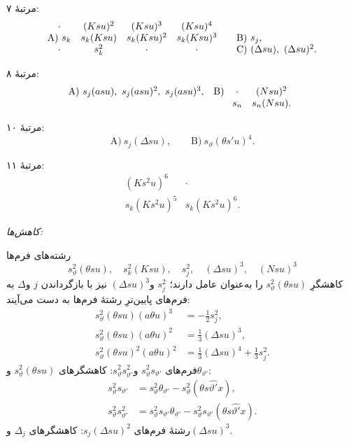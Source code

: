 \documentclass[11pt]{article}
\begin{document}
\noindent مرتبهٔ ۷:
\[
\begin{array}{c@{\quad}c@{\quad}c@{\quad}c@{\qquad}l}
\cdot&(Ksu)^2&(Ksu)^3&(Ksu)^4&\\
\text{A)}\ s_k&s_k(Ksu)&s_k(Ksu)^2&s_k(Ksu)^3&
\text{B)}\ s_j,\\
\cdot&s_k^2&\cdot&\cdot&
\text{C)}\ (\Delta su),\ (\Delta su)^2.
\end{array}
\]

\noindent مرتبهٔ ۸:
\[
\begin{array}{ll}
\text{A)}\ s_j(asu),\ s_j(asu)^2,\ s_j(asu)^3,
&
\text{B)}\ \begin{array}[t]{cc}
\cdot&(Nsu)^2\\
s_n&s_n(Nsu).
\end{array}
\end{array}
\]

\noindent مرتبهٔ ۱۰:
\[
\text{A)}\ s_j(\Delta su),\qquad \text{B)}\ s_\vartheta(\theta s'u)^4.
\]

\noindent مرتبهٔ ۱۱:
\[
\begin{array}{cc}
(Ks^2u)^6&\cdot\\
s_k(Ks^2u)^5&s_k(Ks^2u)^6.
\end{array}
\]

\noindent\emph{کاهش‌ها:}

رشته‌های فرم‌ها
\[
 s_\vartheta^2(\theta su),\quad s_k^2(Ksu),\quad s_j^2,\quad (\Delta su)^3,\quad (Nsu)^3
\]
کاهشگرِ $s_\vartheta^2(\theta su)$ را به‌عنوان عامل دارند؛ $s_j^2$ و$(\Delta su)^3$ نیز با بازگرداندن $j$ و$\Delta$ به فرم‌های پایین‌ترِ رشتهٔ فرم‌ها به دست می‌آیند:
\[
\begin{aligned}
s_\vartheta^2(\theta su)(a\theta u)^3&=-\frac12s_j^2,\\
s_\vartheta^2(\theta su)(a\theta u)^2&=\frac13(\Delta su)^3,\\
s_\vartheta^2(\theta su)^2(a\theta u)^2&=\frac13(\Delta su)^4+\frac13s_j^2.
\end{aligned}
\]
فرم‌های $s_\vartheta^2s_{\vartheta'}$ و$s_\vartheta^2s_{\vartheta'}^2$: کاهشگرهای $s_\vartheta^2(\theta su)$ و$\theta_{\vartheta'}$:
\[
\begin{aligned}
s_\vartheta^2s_{\vartheta'}&=s_\vartheta^2\theta_{\vartheta'}-s_\vartheta^2(\theta s\widehat{\vartheta'}x),\\
s_\vartheta^2s_{\vartheta'}^2&=s_\vartheta^2s_{\vartheta'}\theta_{\vartheta'}-s_\vartheta^2s_{\vartheta'}(\theta s\widehat{\vartheta'}x).
\end{aligned}
\]
رشتهٔ فرم‌های $s_j(\Delta su)^2$: کاهشگرهای $\Delta_j$ و$(\Delta su)^3$.
\end{document}
